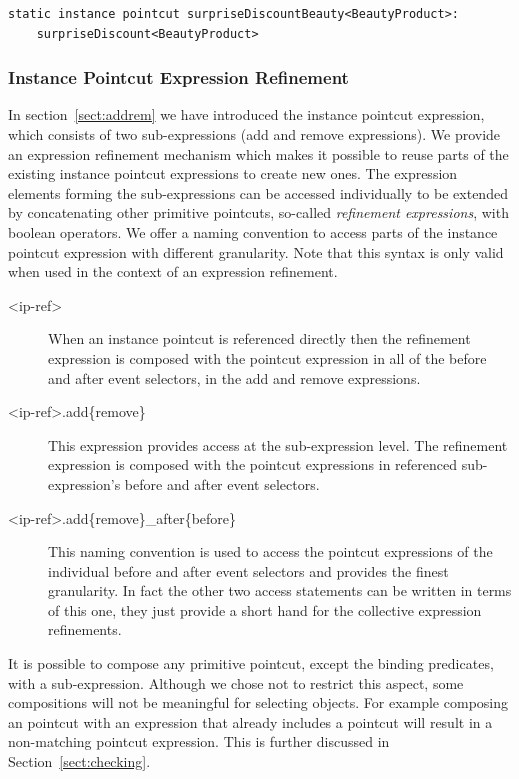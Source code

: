 \begin{lstlisting}[float=h!, caption={A type refined pointcut},label={lst:typeref}]
static instance pointcut surpriseDiscountBeauty<BeautyProduct>: 
	surpriseDiscount<BeautyProduct>
\end{lstlisting}

\subsubsection{Instance Pointcut Expression Refinement}
In section~\ref{sect:addrem} we have introduced the instance pointcut expression, which consists of two sub-expressions (add and remove expressions). 
We provide an expression refinement mechanism which makes it possible to reuse parts of the existing instance pointcut expressions to create new ones. 
The expression elements forming the sub-expressions can be accessed individually to be extended by concatenating other primitive pointcuts, so-called \emph{refinement expressions}, with boolean operators. 
We offer a naming convention to access parts of the instance pointcut expression with different granularity. Note that this syntax is only valid when used in the context of an expression refinement. 
\begin{description}
\item[<ip-ref>]When an instance pointcut is referenced directly then the refinement expression is composed with the pointcut expression in all of the before and after event selectors, in the add and remove expressions.
\item[<ip-ref>.add\{remove\}] This expression provides access at the sub-expression level. The refinement expression is composed with the pointcut expressions in referenced sub-expression's before and after event selectors. 
\item[<ip-ref>.add\{remove\}_after\{before\}] This naming convention is used to access the pointcut expressions of the individual before and after event selectors and provides the finest granularity. In fact the other two access statements can be written in terms of this one, they just provide a short hand for the collective expression refinements. 
\end{description}

It is possible to compose any primitive pointcut, except the binding predicates, with a sub-expression. Although we chose not to restrict this aspect, some compositions will not be meaningful for selecting objects. For example composing an  pointcut with an expression that already includes a  pointcut will result in a non-matching pointcut expression. This is further discussed in Section~\ref{sect:checking}.

